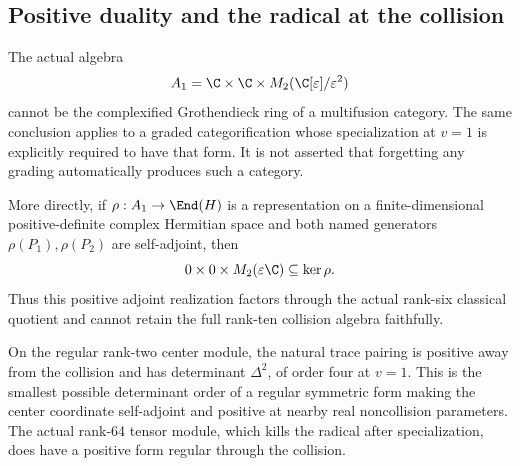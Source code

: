 \subsection{Positive duality and the radical at the collision}
\begin{finding}\label{f:positivecollision}
The actual algebra
\[
 A_1=\C\times\C\times M_2(\C[\varepsilon]/\varepsilon^2)
\]
cannot be the complexified Grothendieck ring of a multifusion
category. The same conclusion applies to a graded categorification
whose specialization at $v=1$ is explicitly required to have that form.
It is not asserted that forgetting any grading automatically produces
such a category.

More directly, if $\rho:A_1\to\End(H)$ is a representation on a
finite-dimensional positive-definite complex Hermitian space and
both named generators $\rho(P_1),\rho(P_2)$ are self-adjoint, then
\[
 0\times0\times M_2(\varepsilon\C)\subseteq\ker\rho.
\]
Thus this positive adjoint realization factors through the actual
rank-six classical quotient and cannot retain the full rank-ten
collision algebra faithfully.

On the regular rank-two center module, the natural trace pairing
is positive away from the collision and has determinant $\Delta^2$,
of order four at $v=1$. This is the smallest possible determinant
order of a regular symmetric form making the center coordinate
self-adjoint and positive at nearby real noncollision parameters.
The actual rank-64 tensor module, which kills the radical after
specialization, does have a positive form regular through the collision.
\end{finding}

